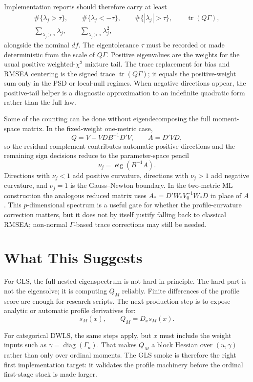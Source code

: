 \documentclass[11pt]{article}
\begin{document}
Implementation reports should therefore carry at least
\[
  \begin{gathered}
    \#\{\lambda_j>\tau\},\qquad
    \#\{\lambda_j<-\tau\},\qquad
    \#\{|\lambda_j|>\tau\},\qquad
    \operatorname{tr}(Q\Gamma),\\
    \sum_{\lambda_j>\tau}\lambda_j,\qquad
    \sum_{\lambda_j>\tau}\lambda_j^2,
  \end{gathered}
\]
alongside the nominal \(df\). The eigentolerance \(\tau\) must be recorded or
made deterministic from the scale of \(Q\Gamma\). Positive eigenvalues are the
weights for the usual positive weighted-\(\chi^2\) mixture tail. The trace
replacement for bias and RMSEA centering is the signed trace
\(\operatorname{tr}(Q\Gamma)\); it equals the positive-weight sum only in the
PSD or local-null regimes. When negative directions appear, the positive-tail
helper is a diagnostic approximation to an indefinite quadratic form rather
than the full law.

Some of the counting can be done without eigendecomposing the full moment-space
matrix. In the fixed-weight one-metric case,
\[
  Q = V - VD B^{-1}D'V,\qquad A=D'VD,
\]
so the residual complement contributes automatic positive directions and the
remaining sign decisions reduce to the parameter-space pencil
\[
  \nu_j=\operatorname{eig}(B^{-1}A).
\]
Directions with \(\nu_j<1\) add positive curvature, directions with
\(\nu_j>1\) add negative curvature, and \(\nu_j=1\) is the Gauss--Newton
boundary. In the two-metric ML construction the analogous reduced matrix uses
\(A_* = D'W_*V_0^{-1}W_*D\) in place of \(A\). This \(p\)-dimensional spectrum is
a useful gate for whether the profile-curvature correction matters, but it does
not by itself justify falling back to classical RMSEA; non-normal
\(\Gamma\)-based trace corrections may still be needed.

\section{What This Suggests}

For GLS, the full nested eigenspectrum is not hard in principle. The hard part
is not the eigensolve; it is computing $Q_M$ reliably. Finite differences of the
profile score are enough for research scripts. The next production step is to
expose analytic or automatic profile derivatives for:
\[
  s_M(x),\qquad Q_M=D_xs_M(x).
\]

For categorical DWLS, the same steps apply, but $x$ must include the weight
inputs such as $\gamma=\operatorname{diag}(\Gamma_u)$. That makes $Q_M$ a block
Hessian over $(u,\gamma)$ rather than only over ordinal moments. The GLS smoke
is therefore the right first implementation target: it validates the profile
machinery before the ordinal first-stage stack is made larger.
\end{document}
